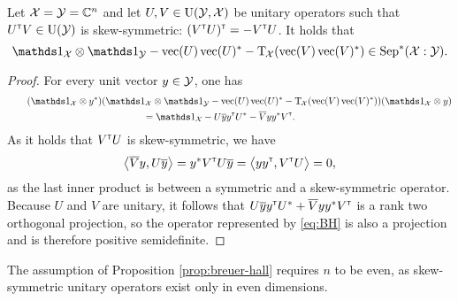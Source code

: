 \begin{prop}
  \label{prop:breuer-hall}
  Let $\mathcal{X} = \mathcal{Y} = \mathbb{C}^n$ and let $U,V\in\mathrm{U}(\mathcal{Y},\mathcal{X})$ be unitary
  operators such that $U^{{\scriptscriptstyle\mathsf{T}}}V \in \mathrm{U}(\mathcal{Y})$ is skew-symmetric:
  $(V^{{\scriptscriptstyle\mathsf{T}}}U)^{{\scriptscriptstyle\mathsf{T}}} = -V^{{\scriptscriptstyle\mathsf{T}}}U$.
  It holds that
  \begin{equation}
    \I_{\X}\otimes\I_{\Y} - \vec(U) \vec(U)^{\ast} - 
        \pt_{\negsmallspace\X}(\vec(V)\vec(V)^{\ast})
    \in \BPos(\X:\Y).
  \end{equation}
\end{prop}

\begin{proof}
  For every unit vector $y\in\mathcal{Y}$, one has
  \begin{multline} \label{eq:BH}
    \qquad
    (\I_{\X} \otimes y^{\ast})
    (\I_{\X}\otimes\I_{\Y} - \vec(U) 
    \vec(U)^{\ast} - \pt_{\negsmallspace\X}(\vec(V)\vec(V)^{\ast}))
    (\I_{\X} \otimes y) \\
    = \I_{\X} - U \overline{y} y^{\t} U^{\ast} - \overline{V}y
    y^{\ast}V^{\t}.
    \qquad
  \end{multline}
  As it holds that $V^{{\scriptscriptstyle\mathsf{T}}}U$ is skew-symmetric, we have
  \begin{equation}
    \bigl\langle \overline{V}y, U\overline{y} \bigr\rangle
    = y^{\ast} V^{{\scriptscriptstyle\mathsf{T}}}U \overline{y} 
    = \bigl\langle y y^{{\scriptscriptstyle\mathsf{T}}}, V^{{\scriptscriptstyle\mathsf{T}}}U \bigr\rangle
    = 0,
  \end{equation}
  as the last inner product is between a symmetric and a skew-symmetric
  operator.
  Because $U$ and $V$ are unitary, it follows that
  $U\overline{y}y^{{\scriptscriptstyle\mathsf{T}}}U^{\ast} + \overline{V}yy^{\ast}V^{{\scriptscriptstyle\mathsf{T}}}$ is a rank two
  orthogonal projection, so the operator represented by \eqref{eq:BH} is also a
  projection and is therefore positive semidefinite.
\end{proof}

\begin{remark}
  The assumption of Proposition \ref{prop:breuer-hall} requires $n$ to be even,
  as skew-symmetric unitary operators exist only in even dimensions.
\end{remark}

